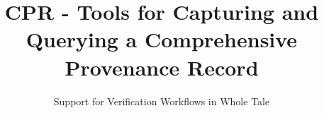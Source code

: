 \documentclass[runningheads]{llncs}
\begin{document}
\title{CPR - Tools for Capturing and Querying a Comprehensive Provenance Record}
\subtitle{Support for Verification Workflows in Whole Tale}

\maketitle

%
%
%
%



\end{document}

